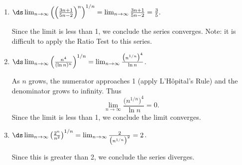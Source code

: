 {\begin{enumerate}
	\item $\ds\lim_{n\to\infty} \left(\left(\frac{3n+1}{5n-2}\right)^n\right)^{1/n} = \lim_{n\to\infty} \frac{3n+1}{5n-2} = \frac 35.$ 
	
	Since the limit is less than 1, we conclude the series converges. Note: it is difficult to apply the Ratio Test to this series.
	
	\item		$\ds\lim_{n\to\infty} \left(\frac{n^4}{(\ln n)^n}\right)^{1/n} = \lim_{n\to\infty} \frac {\big(n^{1/n}\big)^4}{\ln n}  $. 
	
	As $n$ grows, the numerator approaches 1 (apply L'H\^opital's Rule) and the denominator 
	grows to infinity.  Thus $$ \lim_{n\to\infty} \frac{\big(n^{1/n}\big)^4}{\ln n} = 0.$$ Since the limit is less than 1, we conclude the limit converges.
	
	\item		$\ds \lim_{n\to\infty} \left(\frac{2^n}{n^2}\right)^{1/n} = \lim_{n\to\infty} \frac{2}{\big(n^{1/n}\big)^2} = 2$. 
	
	Since this is greater than 2, we conclude the series diverges.
\end{enumerate}
}\\

\clearpage


